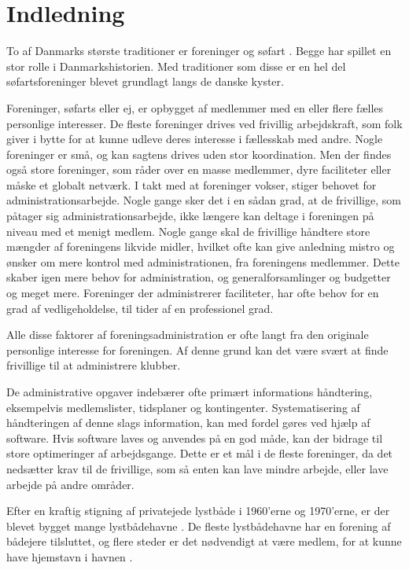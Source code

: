 \chapter{Indledning}
To af Danmarks største traditioner er foreninger og søfart \cite{forening2010}\cite{moller1997}. Begge har spillet en stor rolle i Danmarkshistorien. Med traditioner som disse er en hel del søfartsforeninger blevet grundlagt langs de danske kyster. 

Foreninger, søfarts eller ej, er opbygget af medlemmer med en eller flere fælles personlige interesser. De fleste foreninger drives ved frivillig arbejdskraft, som folk giver i bytte for at kunne udleve deres interesse i fællesskab med andre. Nogle foreninger er små, og kan sagtens drives uden stor koordination. Men der findes også store foreninger, som råder over en masse medlemmer, dyre faciliteter eller måske et globalt netværk. I takt med at foreninger vokser, stiger behovet for administrationsarbejde. Nogle gange sker det i en sådan grad, at de frivillige, som påtager sig administrationsarbejde, ikke længere kan deltage i foreningen på niveau med et menigt medlem. Nogle gange skal de frivillige håndtere store mængder af foreningens likvide midler, hvilket ofte kan give anledning mistro og ønsker om mere kontrol med administrationen, fra foreningens medlemmer. Dette skaber igen mere behov for administration, og generalforsamlinger og budgetter og meget mere. Foreninger der administrerer faciliteter, har ofte behov for en grad af vedligeholdelse, til tider af en professionel grad. 

Alle disse faktorer af foreningsadministration er ofte langt fra den originale personlige interesse for foreningen. Af denne grund kan det være svært at finde frivillige til at administrere klubber.

De administrative opgaver indebærer ofte primært informations håndtering, eksempelvis medlemslister, tidsplaner og kontingenter. Systematisering af håndteringen af denne slags information, kan med fordel gøres ved hjælp af software. Hvis software laves og anvendes på en god måde, kan der bidrage til store optimeringer af arbejdsgange. Dette er et mål i de fleste foreninger, da det nedsætter krav til de frivillige, som så enten kan lave mindre arbejde, eller lave arbejde på andre områder. 

Efter en kraftig stigning af privatejede lystbåde i 1960'erne og 1970'erne, er der blevet bygget mange lystbådehavne \cite{gyldendal_redaktionen_havn_2013}. De fleste lystbådehavne har en forening af bådejere tilsluttet, og flere steder er det nødvendigt at være medlem, for at kunne have hjemstavn i havnen \cite{int_vb_sl}.


